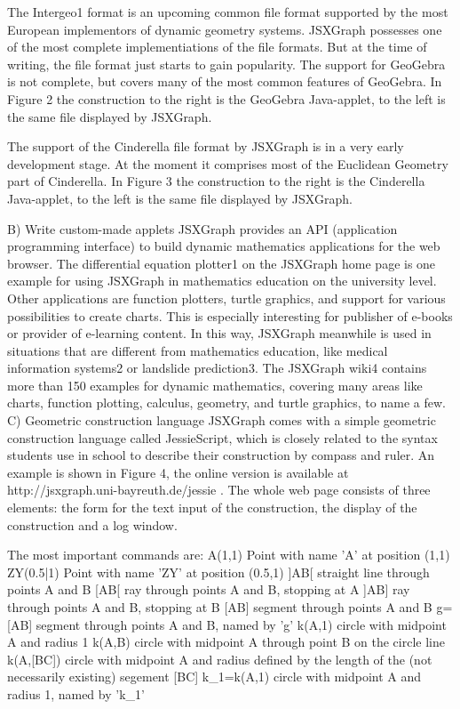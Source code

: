 \documentclass[12pt,a4paper]{article}%
\begin{document}
The Intergeo1 format is an upcoming common file format supported by the most European implementors of dynamic geometry systems. JSXGraph possesses one of the most complete  implementiations of the file formats. But at the time of writing, the file format just starts to gain popularity. 
The support for GeoGebra is not complete, but covers many of the most common features of  GeoGebra. In Figure 2 the construction to the right is the GeoGebra Java-applet, to the left is the same file displayed by JSXGraph.


The support of the Cinderella file format by JSXGraph is in a very early development stage. At the moment it comprises most of the Euclidean Geometry part of Cinderella. In Figure 3 the construction to the right is the Cinderella Java-applet, to the left is the same file displayed by JSXGraph.

B) Write custom-made applets
JSXGraph provides an API (application programming interface) to build dynamic mathematics applications for the web browser. The differential equation plotter1 on the JSXGraph home page is one example for using JSXGraph in mathematics education on the university level. Other applications are function plotters, turtle graphics, and support for various possibilities to create charts. This is especially interesting for publisher of e-books or provider of e-learning content. In this way, JSXGraph meanwhile is used in situations that are different from mathematics education, like medical information systems2 or landslide prediction3. 
The JSXGraph wiki4 contains more than 150 examples for dynamic mathematics, covering many areas like charts, function plotting, calculus, geometry, and turtle graphics, to name a few.
C) Geometric construction language
JSXGraph comes with a simple geometric construction language called JessieScript, which is closely related to the syntax students use in school to describe their construction by compass and ruler. An example is shown in Figure 4, the online version is available at http://jsxgraph.uni-bayreuth.de/jessie . The whole web page consists of three elements: the form for the text input of the construction, the display of the construction and a log window. 

The most important commands are:
A(1,1) 
Point with name 'A' at position (1,1) 
ZY(0.5|1) 
Point with name 'ZY' at position (0.5,1)
 ]AB[
straight line through points A and B
[AB[ 
ray through points A and B, stopping at A
]AB]
ray through points A and B, stopping at B
[AB]
segment through points A and B
g=[AB]
segment through points A and B, named by 'g'
k(A,1) 
circle with midpoint A and radius 1
k(A,B)
circle with midpoint A through point B on the circle line
k(A,[BC]) 
circle with midpoint A and radius defined by the length of the (not necessarily existing) segement [BC]
k_1=k(A,1)
circle with midpoint A and radius 1, named by 'k_1' 
\end{document}
